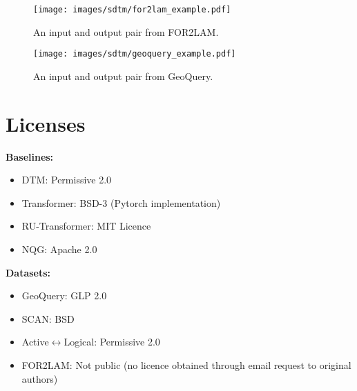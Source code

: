 \begin{figure}
    \centering
    \texttt{[image: images/sdtm/for2lam\_example.pdf]}
    \caption{An input and output pair from FOR2LAM. }
    \label{fig:for2lam-sample}
\end{figure}

\begin{figure}
    \centering
    \texttt{[image: images/sdtm/geoquery\_example.pdf]}
    \caption{An input and output pair from GeoQuery. }
    \label{fig:geoquery-sample}
\end{figure}

\section{Licenses} \label{sec:sdtm-licenses}
\textbf{Baselines:}
\begin{itemize}
    \item DTM: Permissive 2.0
    \item Transformer: BSD-3 (Pytorch implementation)
    \item RU-Transformer: MIT Licence 
    \item NQG: Apache 2.0
\end{itemize}

\textbf{Datasets:}
\begin{itemize}
    \item GeoQuery: GLP 2.0
    \item SCAN: BSD
    \item Active$\leftrightarrow$Logical: Permissive 2.0
    \item FOR2LAM: Not public (no licence obtained through email request to original authors)
\end{itemize}